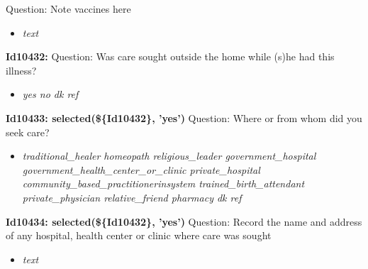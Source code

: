 \documentclass{article}%
\begin{document}
Question: Note vaccines here\newline%
%
\begin{itemize}%
\item%
\textit{text\newline%
}%
\end{itemize}%
\textbf{Id10432: \newline%
}%
Question: Was care sought outside the home while (s)he had this illness?\newline%
%
\begin{itemize}%
\item%
\textit{yes\newline%
 no\newline%
 dk\newline%
 ref\newline%
}%
\end{itemize}%
\textbf{Id10433: selected(\$\{Id10432\}, 'yes')\newline%
}%
Question: Where or from whom did you seek care?\newline%
%
\begin{itemize}%
\item%
\textit{traditional\_healer\newline%
 homeopath\newline%
 religious\_leader\newline%
 government\_hospital\newline%
 government\_health\_center\_or\_clinic\newline%
 private\_hospital\newline%
 community\_based\_practitionerinsystem\newline%
 trained\_birth\_attendant\newline%
 private\_physician\newline%
 relative\_friend\newline%
 pharmacy\newline%
 dk\newline%
 ref\newline%
}%
\end{itemize}%
\textbf{Id10434: selected(\$\{Id10432\}, 'yes')\newline%
}%
Question: Record the name and address of any hospital, health center or clinic where care was sought\newline%
%
\begin{itemize}%
\item%
\textit{text\newline%
}%
\end{itemize}%
\end{document}
